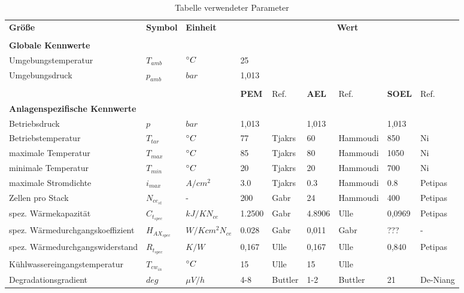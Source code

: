 \documentclass[onecolumn,10pt,titlepage]{article}
\begin{document}
\begin{table}[]
	\tiny

	\caption{Tabelle verwendeter Parameter}
	\label{tab-param2}
	\begin{tabular*}{\textwidth}{lllllllll}



		\multirow{2}{*}{\textbf{Größe}} & \multirow{2}{*}{\textbf{Symbol}} & \multirow{2}{*}{\textbf{Einheit}} & \multicolumn{6}{c}{\multirow{2}{*}{\textbf{Wert}}} \\

		&&&&&&&& \\ \hline \hline

		&&&&&&&& \\

		\textbf{Globale Kennwerte}&&&&&&&& \\

		Umgebungstemperatur 			& $T_{amb}$			& $\degree{C}$		& \multicolumn{6}{l}{25} \\
		Umgebungsdruck		 			& $p_{amb}$			& $bar		$		& \multicolumn{6}{l}{1,013} \\

		&&&&&&&& \\


		&&&  \textbf{PEM} & Ref. & \textbf{AEL} & Ref. & \textbf{SOEL} & Ref. \\

		\textbf{Anlagenspezifische Kennwerte}&&&&&&&& \\
		Betriebsdruck 							& $p$ 					& $bar$ 			& 1,013		& 	 		& 1,013 				& 	 		& 1,013					& 	 		\\
		Betriebstemperatur						& $T_{tar}$				& $\degree{C}$ 		& 77 		& Tjakrs	& 60 					& Hammoudi	& 850 					& Ni 		\\[2ex]
		maximale Temperatur						& $T_{max}$				& $\degree{C}$ 		& 85 		& Tjakrs	& 80 					& Hammoudi	& 1050 					& Ni 		\\
		minimale Temperatur						& $T_{min}$				& $\degree{C}$ 		& 20 		& Tjakrs	& 20 					& Hammoudi	& 700 					& Ni 		\\
		maximale Stromdichte 					& $i_{max}$ 			& $A/{cm^2}$ 		& 3.0 		& Tjakrs	& 0.3 					& Hammoudi	& 0.8 					& Petipas 	\\
		Zellen pro Stack						& $N_{ce_{st}}$			& -				 	& 200		& Gabr		& 24					& Hammoudi 	& 400 					& Petipas 	\\
		spez. Wärmekapazität					& $C_{t_{spec}}$		& $kJ/KN_{ce}$ 		& 1.2500	& Gabr		& 4.8906 				& Ulle		& 0,0969				& Petipas 	\\
		spez. Wärmedurchgangskoeffizient		& $H_{AX_{spec}}$		& $W/Kcm^{2}N_{ce}$				& 0.028		& Gabr					& 0,011 	& Gabr		& ??? 		& - 		\\
		spez. Wärmedurchgangswiderstand			& $R_{t_{spec}}$		& $K/W$				& 0,167 	& Ulle		& 0,167					& Ulle		& 0,840					& Petipas 	\\
		Kühlwassereingangstemperatur			& $T_{cw_{in}}$			& $\degree{C}$ 		& 15 		& Ulle		& 15 					& Ulle		& 	 					& 	 		\\
		Degradationsgradient 					& $deg$ 				& ${\mu}V/h$		& 4-8 		& Buttler	& 1-2 					& Buttler	& 21 					& De-Niang 	\\


\end{tabular*}
\end{table}
\end{document}
